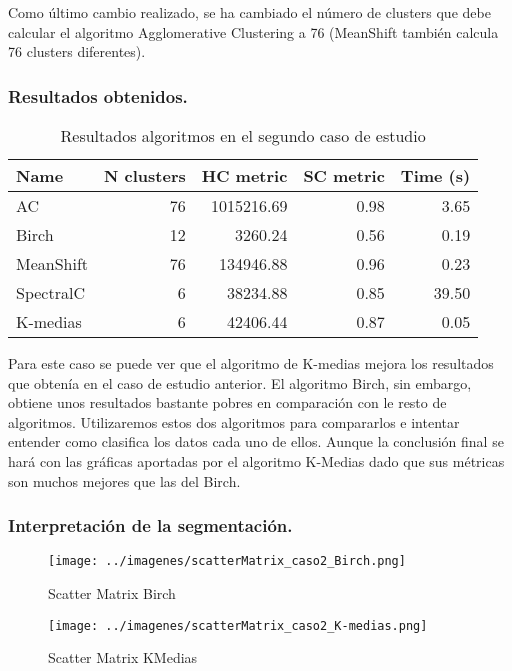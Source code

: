 	\vspace{0.06in}
	Como último cambio realizado, se ha cambiado el número de clusters que debe calcular el algoritmo Agglomerative Clustering a 76 (MeanShift también calcula 76 clusters diferentes).
	\subsubsection{Resultados obtenidos.}
	
	\begin{table}[H]
	\centering
		\begin{tabular}{lrrrr}
			\toprule
			Name  &N clusters&	HC metric& 	SC metric& 	Time (s) \\
			\midrule  
			AC&       	76&        	1015216.69&	0.98&      	3.65 \\     
			Birch&     	12&        	3260.24&   	0.56&      	0.19 \\      
			MeanShift&  	76&        	134946.88& 	0.96&      	0.23 \\     
			SpectralC&  	6&         	38234.88&  	0.85&      	39.50 \\     
			K-medias&	6&         	42406.44&  	0.87&      	0.05\\      
			\bottomrule
		\end{tabular}
	\caption{Resultados algoritmos en el segundo caso de estudio}
	\label{table:res_caso2}
	\end{table}

	Para este caso se puede ver que el algoritmo de K-medias mejora los resultados que obtenía en el caso de estudio anterior. El algoritmo Birch, sin embargo, obtiene unos resultados bastante pobres en comparación con le resto de algoritmos. Utilizaremos estos dos algoritmos para compararlos e intentar entender como clasifica los datos cada uno de ellos. Aunque la conclusión final se hará con las gráficas aportadas por el algoritmo K-Medias dado que sus métricas son muchos mejores que las del Birch. 
	\subsubsection{Interpretación de la segmentación.}
	
	\begin{figure}[H]
		\centering
		\texttt{[image: ../imagenes/scatterMatrix\_caso2\_Birch.png]}
		\caption{Scatter Matrix Birch}
		\label{fig:scatter_caso2_Birch}
	\end{figure}
	
	\begin{figure}[H]
		\centering
		\texttt{[image: ../imagenes/scatterMatrix\_caso2\_K-medias.png]}
		\caption{Scatter Matrix KMedias}
		\label{fig:scatter_caso2_KMedias}
	\end{figure}
	
